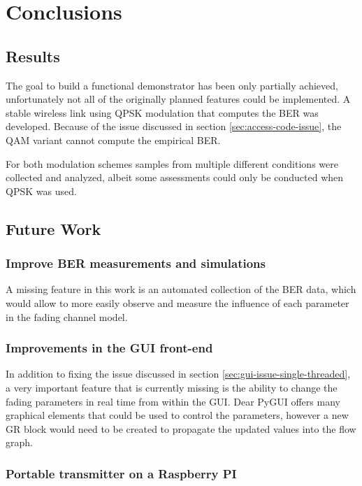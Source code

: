 
\chapter{Conclusions} \label{chp:conclusions}

\section{Results}

The goal to build a functional demonstrator has been only partially achieved, unfortunately not all of the originally planned features could be implemented. A stable wireless link using QPSK modulation that computes the BER was developed. Because of the issue discussed in section \ref{sec:access-code-issue}, the QAM variant cannot compute the empirical BER.

For both modulation schemes samples from multiple different conditions were collected and analyzed, albeit some assessments could only be conducted when QPSK was used.

\section{Future Work}

\subsection{Improve BER measurements and simulations}

A missing feature in this work is an automated collection of the BER data, which would allow to more easily observe and measure the influence of each parameter in the fading channel model.

\subsection{Improvements in the GUI front-end}\label{GUI-improfment}

In addition to fixing the issue discussed in section \ref{sec:gui-issue-single-threaded}, a very important feature that is currently missing is the ability to change the fading parameters in real time from within the GUI. Dear PyGUI offers many graphical elements that could be used to control the parameters, however a new GR block would need to be created to propagate the updated values into the flow graph.

\subsection{Portable transmitter on a Raspberry PI}



